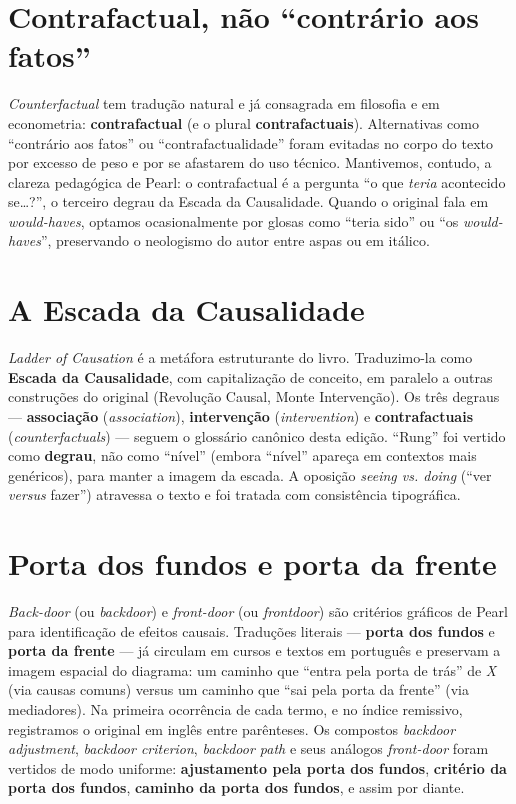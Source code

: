 \documentclass[11pt,a5paper,twoside]{book}
\begin{document}
\section{Contrafactual, não “contrário aos fatos”}
\textit{Counterfactual} tem tradução natural e já consagrada em filosofia e em econometria: \textbf{contrafactual} (e o plural \textbf{contrafactuais}). Alternativas como “contrário aos fatos” ou “contrafactualidade” foram evitadas no corpo do texto por excesso de peso e por se afastarem do uso técnico. Mantivemos, contudo, a clareza pedagógica de Pearl: o contrafactual é a pergunta “o que \textit{teria} acontecido se…?”, o terceiro degrau da Escada da Causalidade. Quando o original fala em \textit{would-haves}, optamos ocasionalmente por glosas como “teria sido” ou “os \textit{would-haves}”, preservando o neologismo do autor entre aspas ou em itálico.

\section{A Escada da Causalidade}
\textit{Ladder of Causation} é a metáfora estruturante do livro. Traduzimo-la como \textbf{Escada da Causalidade}, com capitalização de conceito, em paralelo a outras construções do original (Revolução Causal, Monte Intervenção). Os três degraus — \textbf{associação} (\textit{association}), \textbf{intervenção} (\textit{intervention}) e \textbf{contrafactuais} (\textit{counterfactuals}) — seguem o glossário canônico desta edição. “Rung” foi vertido como \textbf{degrau}, não como “nível” (embora “nível” apareça em contextos mais genéricos), para manter a imagem da escada. A oposição \textit{seeing vs. doing} (“ver \textit{versus} fazer”) atravessa o texto e foi tratada com consistência tipográfica.

\section{Porta dos fundos e porta da frente}
\textit{Back-door} (ou \textit{backdoor}) e \textit{front-door} (ou \textit{frontdoor}) são critérios gráficos de Pearl para identificação de efeitos causais. Traduções literais — \textbf{porta dos fundos} e \textbf{porta da frente} — já circulam em cursos e textos em português e preservam a imagem espacial do diagrama: um caminho que “entra pela porta de trás” de \textit{X} (via causas comuns) versus um caminho que “sai pela porta da frente” (via mediadores). Na primeira ocorrência de cada termo, e no índice remissivo, registramos o original em inglês entre parênteses. Os compostos \textit{backdoor adjustment}, \textit{backdoor criterion}, \textit{backdoor path} e seus análogos \textit{front-door} foram vertidos de modo uniforme: \textbf{ajustamento pela porta dos fundos}, \textbf{critério da porta dos fundos}, \textbf{caminho da porta dos fundos}, e assim por diante.
\end{document}
